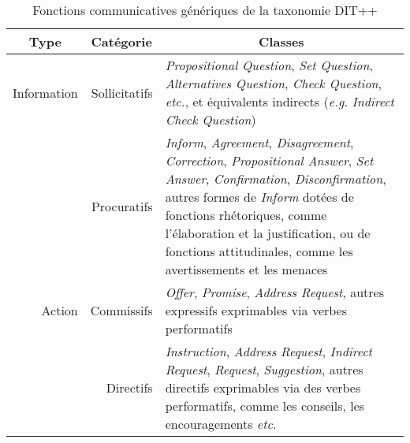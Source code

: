 \documentclass[10pt,a4paper,twoside]{article}
\begin{document}
\begin{table}[h]
	\centering
	\begin{tabularx}{\textwidth}{rrX}
		\toprule
		\multicolumn{1}{c}{Type} & \multicolumn{1}{c}{Catégorie} & \multicolumn{1}{c}{Classes} \\
		\midrule
		Information & Sollicitatifs & \textit{Propositional Question}, \textit{Set Question}, \textit{Alternatives Question}, \textit{Check Question}, \textit{etc.}, et équivalents indirects (\textit{e.g.} \textit{Indirect Check Question}) \\
		\cmidrule(r){2-3}
		& Procuratifs & \textit{Inform}, \textit{Agreement}, \textit{Disagreement}, \textit{Correction}, \textit{Propositional Answer}, \textit{Set Answer}, \textit{Confirmation}, \textit{Disconfirmation}, autres formes de \textit{Inform} dotées de fonctions rhétoriques, comme l’élaboration et la justification, ou de fonctions attitudinales, comme les avertissements et les menaces \\
		\cmidrule(r){1-3}
		Action & Commissifs & \textit{Offer}, \textit{Promise}, \textit{Address Request}, autres expressifs exprimables via verbes performatifs \\
		\cmidrule(r){2-3}
		& Directifs & \textit{Instruction}, \textit{Address Request}, \textit{Indirect} \textit{Request}, \textit{Request}, \textit{Suggestion}, autres directifs exprimables via des verbes performatifs, comme les conseils, les encouragements \textit{etc.} \\
		\bottomrule
	\end{tabularx}
	\caption{Fonctions communicatives génériques de la taxonomie DIT++}
	\label{fig:DITClasses}
\end{table}


\end{document}
